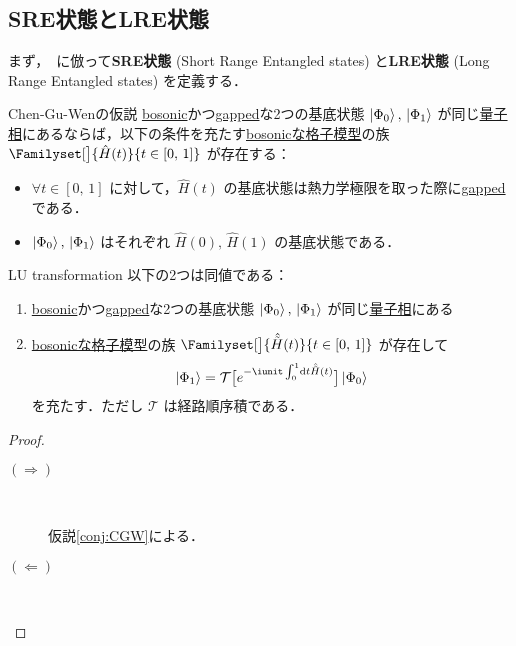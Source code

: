 \documentclass[TQFT_main]{subfiles}
\begin{document}
\subsection{SRE状態とLRE状態}

まず，~\cite[p.3]{ChenGuWen2010}に倣って\textbf{SRE状態} (Short Range Entangled states) と\textbf{LRE状態} (Long Range Entangled states) を定義する．
~\cite[p.4]{ChenGuWen2010}
\begin{myconj}[label=conj:CGW]{Chen-Gu-Wenの仮説}
    \hyperref[def:bosonic-lattice-model]{bosonic}かつ\hyperref[def:gapped]{gapped}な2つの基底状態 $\ket{\Phi_0},\, \ket{\Phi_1}$ が同じ\hyperref[def:quantum-phase]{量子相}にあるならば，以下の条件を充たす\hyperref[def:bosonic-lattice-model]{bosonicな格子模型}の族 $\Familyset[\big]{\hat{H}(t)}{t \in [0,\, 1]}$ が存在する：
    \begin{itemize}
        \item $\forall t \in [0,\, 1]$ に対して，$\hat{H}(t)$ の基底状態は熱力学極限を取った際に\hyperref[def:gapped]{gapped}である．
        \item $\ket{\Phi_0},\, \ket{\Phi_1}$ はそれぞれ $\hat{H}(0),\, \hat{H}(1)$ の基底状態である．
    \end{itemize}
\end{myconj}

\begin{myprop}[label=prop:LU]{LU transformation}
    以下の2つは同値である：
    \begin{enumerate}
        \item \hyperref[def:bosonic-lattice-model]{bosonic}かつ\hyperref[def:gapped]{gapped}な2つの基底状態 $\ket{\Phi_0},\, \ket{\Phi_1}$ が同じ\hyperref[def:quantum-phase]{量子相}にある
        \item \hyperref[def:bosonic-lattice-model]{bosonicな格子模型}の族 $\Familyset[\big]{\hat{\tilde{H}}(t)}{t \in [0,\, 1]}$ が存在して
        \begin{align}
            \label{eq:LU}
            \ket{\Phi_1} = \mathcal{T} \bigl[ e^{-\iunit \int_0^1 \dd{t} \hat{\tilde{H}}(t)} \bigr] \ket{\Phi_0}
        \end{align}
        を充たす．ただし $\mathcal{T}$ は経路順序積である．
    \end{enumerate}
\end{myprop}

\begin{proof}
    \begin{description}
        \item[$\bm{(\Longrightarrow)}$]　
        
        仮説\ref{conj:CGW}による．

        \item[$\bm{(\Longleftarrow)}$]　
        

    \end{description}
    
\end{proof}
\end{document}
